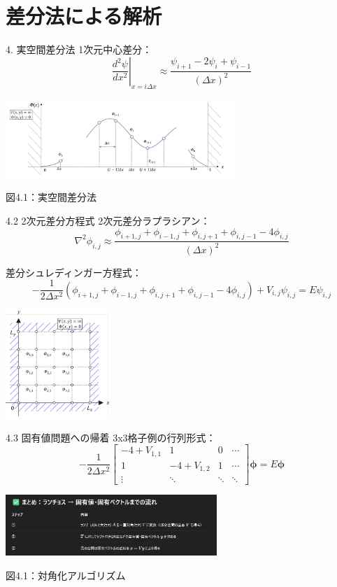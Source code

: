 \documentclass{beamer}
\begin{document}
\section{差分法による解析}
\begin{frame}{4. 実空間差分法}
1次元中心差分：
\[
\left. \frac{d^2 \psi}{dx^2} \right|_{x = i\Delta x}
\approx \frac{\psi_{i+1} - 2\psi_i + \psi_{i-1}}{(\Delta x)^2}
\]

\begin{center}
  \includegraphics[width=0.65\textwidth]{images/一次元.png}
  
  図4.1：実空間差分法
\end{center}
\end{frame}

\begin{frame}{4.2 2次元差分方程式}
2次元差分ラプラシアン：
\[
\nabla^2 \phi_{i,j} \approx \frac{\phi_{i+1,j} + \phi_{i-1,j} + \phi_{i,j+1} + \phi_{i,j-1} - 4\phi_{i,j}}{(\Delta x)^2}
\]

差分シュレディンガー方程式：
\[
-\frac{1}{2\Delta x^2} (\phi_{i+1,j} + \phi_{i-1,j} + \phi_{i,j+1} + \phi_{i,j-1} - 4\phi_{i,j}) + V_{i,j} \psi_{i,j} = E \psi_{i,j}
\]

\begin{flushright}
\includegraphics[width=0.3\textwidth]{images/二次元.png}
\end{flushright}
\end{frame}

\begin{frame}{4.3 固有値問題への帰着}
\scriptsize
3x3格子例の行列形式：
\[
-\frac{1}{2\Delta x^2}
\begin{bmatrix}
-4+V_{1,1} & 1 & 0 & \cdots \\
1 & -4+V_{1,2} & 1 & \cdots \\
\vdots & \ddots & \ddots & \ddots
\end{bmatrix}
\bm{\phi}
=
E \bm{\phi}
\]

\begin{center}
\includegraphics[width=0.6\textwidth]{images/アルゴリズム.png}

図4.1：対角化アルゴリズム
\end{center}
\end{frame}
\end{document}
